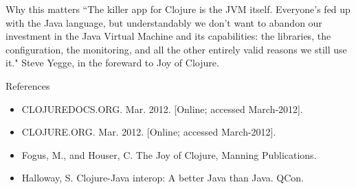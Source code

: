 \documentclass[xcolor=dvipsnames]{beamer}
\begin{document}
	\begin{frame}{Why this matters}
		``The killer app for Clojure is the JVM itself. Everyone's fed up with the Java language, but understandably we don't want to abandon our investment in the Java Virtual Machine and its capabilities: the libraries, the configuration, the monitoring, and all the other entirely valid reasons we still use it."  
		\newline
		Steve Yegge, in the foreward to Joy of Clojure.
	\end{frame}
	
	\begin{frame}{References}
	\begin{itemize}
	\item CLOJUREDOCS.ORG. Mar. 2012. [Online; accessed March-2012].
	\item CLOJURE.ORG. Mar. 2012. [Online; accessed March-2012].
	\item Fogus, M., and Houser, C. The Joy of Clojure, Manning Publications.
	\item Halloway, S. Clojure-Java interop: A better Java than Java. QCon.
	\end{itemize}
	\end{frame}
\end{document}
